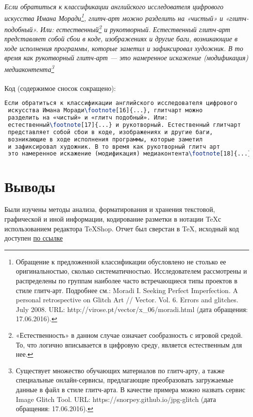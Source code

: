 \documentclass[a4paper]{article}
\begin{document}
\emph{Если обратиться к классификации английского исследователя цифрового искусства Имана Моради\footnote[16]{Обращение к предложенной классификации обусловлено не столько ее оригинальностью, сколько систематичностью. Исследователем рассмотрены и распределены по группам наиболее часто встречающиеся типы проектов в стиле глитч-арт. Подробнее см.: Moradi I. Seeking Perfect Imperfection. A personal retrospective on Glitch Art // Vector. Vol. 6. Errors and glitches. July 2008. URL: http://virose.pt/vector/x\_06/moradi.html (дата обращения: 17.06.2016).}, глитч-арт можно разделить на «чистый» и «глитч-подобный». Или: естественный\footnote[17]{«Естественность» в данном случае означает сообразность с игровой средой. То, что логично вписывается в цифровую среду, является естественным для нее.} и рукотворный. Естественный глитч-арт представляет собой сбои в коде, изображениях и другие баги, возникающие в ходе исполнения программы, которые заметил и зафиксировал художник. В то время как рукотворный глитч-арт — это намеренное искажение (модификация) медиаконтента\footnote[18]{Существует множество обучающих материалов по глитч-арту, а также специальные онлайн-сервисы, предлагающие преобразовать загружаемые данные в файл в стиле глитч-арта. В качестве примера можно назвать сервис Image Glitch Tool. URL: https://snorpey.github.io/jpg-glitch (дата обращения: 17.06.2016).} }\\\\
\hfill\break
Код (содержимое сносок сокращено):\\
\begin{lstlisting}[language=TeX]
 Если обратиться к классификации английского исследователя цифрового 
 искусства Имана Моради\footnote[16]{...}, глитчарт можно 
 разделить на «чистый» и «глитч подобный». Или: 
 естественный\footnote[17]{...} и рукотворный. Естественный глитчарт 
 представляет собой сбои в коде, изображениях и другие баги, 
 возникающие в ходе исполнения программы, которые заметил 
 и зафиксировал художник. В то время как рукотворный глитч арт  
 это намеренное искажение (модификация) медиаконтента\footnote[18]{...}
\end{lstlisting}
\thispagestyle{empty}
\newpage
\section{Выводы}
Были изучены методы анализа, форматирования и хранения текстовой, графической и иной информации, кодирование разметки в нотации \TeX с использованием редактора \TeX Shop. Отчет был сверстан в \TeX, исходный код доступен \href{https://github.com/mammuthus/SUAI-Stuff/blob/main/LaTeX_LR1.tex}{по ссылке}
\end{document}

